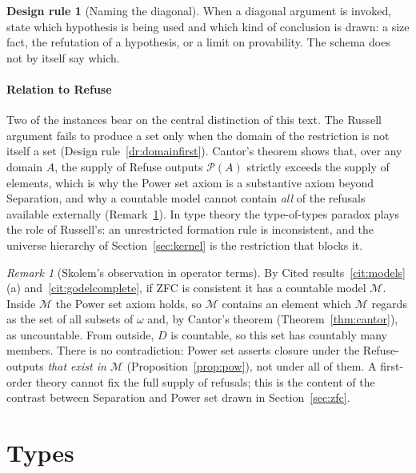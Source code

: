 \documentclass[11pt]{article}
\newcommand{\Pow}{\mathcal{P}}
\theoremstyle{definition}
\newtheorem{designrule}[definition]{Design rule}
\theoremstyle{plain}
\theoremstyle{remark}
\newtheorem{remark}[definition]{Remark}
\begin{document}
\begin{designrule}[Naming the diagonal]\label{dr:diag}
When a diagonal argument is invoked, state which hypothesis is being used and which kind of conclusion is drawn: a size fact, the refutation of a hypothesis, or a limit on provability. The schema does not by itself say which.
\end{designrule}

\subsection{Relation to Refuse}

Two of the instances bear on the central distinction of this text. The Russell argument fails to produce a set only when the domain of the restriction is not itself a set (Design rule~\ref{dr:domainfirst}). Cantor's theorem shows that, over any domain $A$, the supply of Refuse outputs $\Pow(A)$ strictly exceeds the supply of elements, which is why the Power set axiom is a substantive axiom beyond Separation, and why a countable model cannot contain \emph{all} of the refusals available externally (Remark~\ref{rem:skolem}). In type theory the type-of-types paradox plays the role of Russell's: an unrestricted formation rule is inconsistent, and the universe hierarchy of Section~\ref{sec:kernel} is the restriction that blocks it.

\begin{remark}[Skolem's observation in operator terms]\label{rem:skolem}
By Cited results~\ref{cit:models}(a) and~\ref{cit:godelcomplete}, if ZFC is consistent it has a countable model $\mathcal M$. Inside $\mathcal M$ the Power set axiom holds, so $\mathcal M$ contains an element which $\mathcal M$ regards as the set of all subsets of $\omega$ and, by Cantor's theorem (Theorem~\ref{thm:cantor}), as uncountable. From outside, $D$ is countable, so this set has countably many members. There is no contradiction: Power set asserts closure under the Refuse-outputs \emph{that exist in $\mathcal M$} (Proposition~\ref{prop:pow}), not under all of them. A first-order theory cannot fix the full supply of refusals; this is the content of the contrast between Separation and Power set drawn in Section~\ref{sec:zfc}.
\end{remark}

\part{Types}
\end{document}
